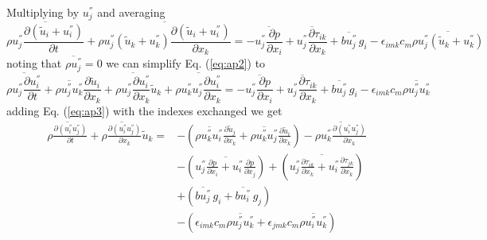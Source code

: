 Multiplying by $u^{''}_j$ and averaging
\begin{equation}
\label{eq:ap2}
\overline{\rho u^{''}_j \frac{\partial (\tilde{u}_i+u^{''}_i)}{\partial t}} +
\overline{\rho u^{''}_j (\tilde{u}_k+u^{''}_k)\frac{\partial (\tilde{u}_i+u^{''}_i)}{\partial x_k} } =
- \overline{u^{''}_j \frac{\partial p}{\partial x_i}} +
\overline{u^{''}_j \frac{\partial \tau_{ik}}{\partial x_k} }
+\overline{bu^{''}_j}\,g_i-\epsilon_{imk} c_m\overline{\rho u^{''}_j(\tilde{u}_k+u^{''}_k)}
\end{equation}
noting that $\overline{\rho u^{''}_j}=0$ we can simplify Eq. (\ref{eq:ap2}) to
\begin{equation}
\label{eq:ap3}
\overline{\rho u^{''}_j \frac{\partial u^{''}_i}{\partial t}} +
\overline{\rho u^{''}_j u^{''}_k }\frac{\partial \tilde{u}_i}{\partial x_k} +
\overline{\rho u^{''}_j \frac{\partial u^{''}_i}{\partial x_k} } \tilde{u}_k +
\overline{\rho u^{''}_k u^{''}_j \frac{\partial u^{''}_i}{\partial x_k} }  =
- \overline{u^{''}_j \frac{\partial p}{\partial x_i}} +
\overline{u^{''}_j \frac{\partial \tau_{ik}}{\partial x_k} }
+\overline{bu^{''}_j}\,g_i-\epsilon_{imk} c_m\overline{\rho u^{''}_ju^{''}_k}
\end{equation}
adding Eq. (\ref{eq:ap3}) with the indexes exchanged we get
\begin{equation}\label{eq:ap4}
  \begin{split}
    \overline{\rho \frac{\partial (u^{''}_i u^{''}_j)}{\partial t}} +
     \overline{\rho \frac{\partial (u^{''}_i u^{''}_j)}{\partial x_k}}
    \tilde{u}_k = & - (\overline{\rho u^{''}_k u^{''}_i} \frac{\partial 
      \tilde{u}_j}{\partial x_k}+\overline{\rho u^{''}_k u^{''}_j} 
    \frac{\partial \tilde{u}_i}{\partial x_k})
    - \overline{\rho u^{''}_k \frac{\partial (u^{''}_i u^{''}_j)}{\partial 
        x_k}} \\
    & - (\overline{u^{''}_j \frac{\partial p}{\partial x_i}+u^{''}_i 
      \frac{\partial p}{\partial x_j}}) + (\overline{u^{''}_j 
      \frac{\partial \tau_{ik}}{\partial x_k}+u^{''}_i \frac{\partial 
        \tau_{jk}}{\partial x_k}}) \\
    & + (\overline{bu^{''}_j}\,g_i+\overline{bu^{''}_i}\,g_j)\\
    & - (\epsilon_{imk} c_m\overline{\rho u^{''}_ju^{''}_k} +
         \epsilon_{jmk} c_m\overline{\rho u^{''}_iu^{''}_k} )
  \end{split}
\end{equation}

